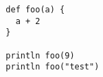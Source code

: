 {\scriptsize \begin{verbatim}
  def foo(a) {
    a + 2
  }

  println foo(9)
  println foo("test")
\end{verbatim} }
